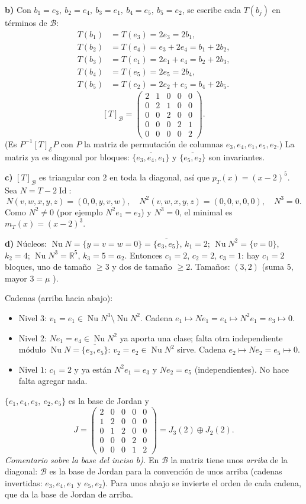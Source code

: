 \documentclass{article}
\newcommand{\R}{\mathbb{R}}
\newcommand{\gen}[1]{\overline{\{#1\}}}          %
\DeclareMathOperator{\Nu}{Nu}
\DeclareMathOperator{\Id}{Id}
\theoremstyle{plain}
\theoremstyle{definition}
\theoremstyle{remark}
\begin{document}
\textbf{b)} Con \(b_1=e_3,\ b_2=e_4,\ b_3=e_1,\ b_4=e_5,\ b_5=e_2\), se escribe cada \(T(b_j)\) en términos de \(\mathcal B\):
\begin{align*}
    T(b_1) & =T(e_3)=2e_3=2b_1,         \\
    T(b_2) & =T(e_4)=e_3+2e_4=b_1+2b_2, \\
    T(b_3) & =T(e_1)=2e_1+e_4=b_2+2b_3, \\
    T(b_4) & =T(e_5)=2e_5=2b_4,         \\
    T(b_5) & =T(e_2)=2e_2+e_5=b_4+2b_5.
\end{align*}
\[
    [T]_{\mathcal B}=\begin{pmatrix}2&1&0&0&0\\0&2&1&0&0\\0&0&2&0&0\\0&0&0&2&1\\0&0&0&0&2\end{pmatrix}.
\]
(Es \(P^{-1}[T]_{\mathcal E}P\) con \(P\) la matriz de permutación de columnas \(e_3,e_4,e_1,e_5,e_2\).) La matriz ya es diagonal por bloques: \(\gen{e_3,e_4,e_1}\) y \(\gen{e_5,e_2}\) son invariantes.

\textbf{c)} \([T]_{\mathcal B}\) es triangular con \(2\) en toda la diagonal, así que \(p_T(x)=(x-2)^5\). Sea \(N=T-2\Id\):
\[
    N(v,w,x,y,z)=(0,0,y,v,w),\quad N^2(v,w,x,y,z)=(0,0,v,0,0),\quad N^3=0.
\]
Como \(N^2\ne0\) (por ejemplo \(N^2e_1=e_3\)) y \(N^3=0\), el minimal es \(m_T(x)=(x-2)^3\).

\textbf{d)} Núcleos: \(\Nu N=\{y=v=w=0\}=\gen{e_3,e_5}\), \(k_1=2\); \(\Nu N^2=\{v=0\}\), \(k_2=4\); \(\Nu N^3=\R^5\), \(k_3=5=a_2\). Entonces \(c_1=2\), \(c_2=2\), \(c_3=1\): hay \(c_1=2\) bloques, uno de tamaño \(\ge3\) y dos de tamaño \(\ge2\). Tamaños: \((3,2)\) (suma \(5\), mayor \(3=\mu\) \checkmark).

Cadenas (arriba hacia abajo):
\begin{itemize}
    \item Nivel \(3\): \(v_1=e_1\in\Nu N^3\setminus\Nu N^2\). Cadena \(e_1\mapsto Ne_1=e_4\mapsto N^2e_1=e_3\mapsto0\).
    \item Nivel \(2\): \(Ne_1=e_4\in\Nu N^2\) ya aporta una clase; falta otra independiente módulo \(\Nu N=\gen{e_3,e_5}\): \(v_2=e_2\in\Nu N^2\) sirve. Cadena \(e_2\mapsto Ne_2=e_5\mapsto0\).
    \item Nivel \(1\): \(c_1=2\) y ya están \(N^2e_1=e_3\) y \(Ne_2=e_5\) (independientes). No hace falta agregar nada.
\end{itemize}
\(\{e_1,e_4,e_3,\ e_2,e_5\}\) es la base de Jordan y
\[
    J=\begin{pmatrix}2&0&0&0&0\\1&2&0&0&0\\0&1&2&0&0\\0&0&0&2&0\\0&0&0&1&2\end{pmatrix}=J_3(2)\oplus J_2(2).
\]
\emph{Comentario sobre la base del inciso b).} En \(\mathcal B\) la matriz tiene unos \emph{arriba} de la diagonal: \(\mathcal B\) es la base de Jordan para la convención de unos arriba (cadenas invertidas: \(e_3,e_4,e_1\) y \(e_5,e_2\)). Para unos abajo se invierte el orden de cada cadena, que da la base de Jordan de arriba.
\end{document}
